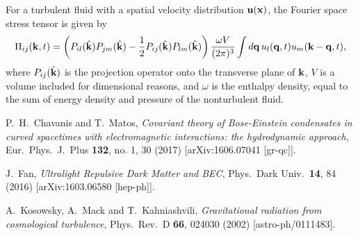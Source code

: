 \documentclass[onecolumn,nofootinbib,superscriptaddress]{revtex4}
\begin{document}
For a turbulent fluid with a spatial velocity distribution $\bf{u}(\bf{x})$, the Fourier space stress tensor is given \cite{Kosowsky:2001xp} by
\begin{equation}
\Pi_{ij}({\bf{k}},t) = \left(P_{il}(\hat{\bf{k}})P_{jm}(\hat{\bf{k}})-\frac{1}{2}P_{ij}(\hat{\bf{k}})P_{lm}(\hat{\bf{k}})\right)\frac{\omega V}{(2\pi)^3}\int d{\bf{q}} \,u_l({\bf{q}},t)u_m({\bf{k}}-{\bf{q}},t),
\end{equation}
where $P_{ij}(\hat{\bf{k}})$ is the projection operator onto the transverse plane of ${\bf{k}}$, $V$ is a volume included for dimensional reasons, and $\omega$ is the enthalpy density, equal to the sum of energy density and pressure of the nonturbulent fluid.









\begin{thebibliography}{99}

  P.~H.~Chavanis and T.~Matos,
  \emph{Covariant theory of Bose-Einstein condensates in curved spacetimes with electromagnetic interactions: the hydrodynamic approach},
  Eur.\ Phys.\ J.\ Plus {\bf 132}, no. 1, 30 (2017)
  [arXiv:1606.07041 [gr-qc]].

  J.~Fan,
  \emph{Ultralight Repulsive Dark Matter and BEC},
  Phys.\ Dark Univ.\  {\bf 14}, 84 (2016)
  [arXiv:1603.06580 [hep-ph]].

  A.~Kosowsky, A.~Mack and T.~Kahniashvili,
  \emph{Gravitational radiation from cosmological turbulence},
  Phys.\ Rev.\ D {\bf 66}, 024030 (2002)
  [astro-ph/0111483].


\end{thebibliography}
\end{document}
